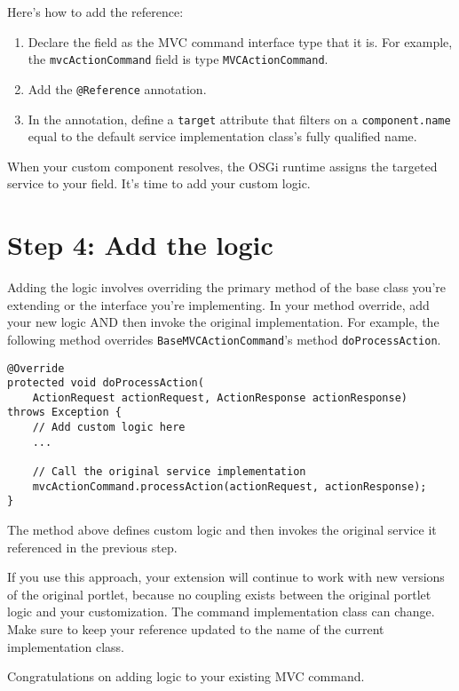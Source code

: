 Here's how to add the reference:

\begin{enumerate}
\def\labelenumi{\arabic{enumi}.}
\item
  Declare the field as the MVC command interface type that it is. For
  example, the \texttt{mvcActionCommand} field is type
  \texttt{MVCActionCommand}.
\item
  Add the \texttt{@Reference} annotation.
\item
  In the annotation, define a \texttt{target} attribute that filters on
  a \texttt{component.name} equal to the default service implementation
  class's fully qualified name.
\end{enumerate}

When your custom component resolves, the OSGi runtime assigns the
targeted service to your field. It's time to add your custom logic.

\section{Step 4: Add the logic}\label{step-4-add-the-logic}

Adding the logic involves overriding the primary method of the base
class you're extending or the interface you're implementing. In your
method override, add your new logic AND then invoke the original
implementation. For example, the following method overrides
\texttt{BaseMVCActionCommand}'s method \texttt{doProcessAction}.

\begin{verbatim}
@Override
protected void doProcessAction(
    ActionRequest actionRequest, ActionResponse actionResponse)
throws Exception {
    // Add custom logic here 
    ...
    
    // Call the original service implementation 
    mvcActionCommand.processAction(actionRequest, actionResponse);
}
\end{verbatim}

The method above defines custom logic and then invokes the original
service it referenced in the previous step.

If you use this approach, your extension will continue to work with new
versions of the original portlet, because no coupling exists between the
original portlet logic and your customization. The command
implementation class can change. Make sure to keep your reference
updated to the name of the current implementation class.

Congratulations on adding logic to your existing MVC command.

